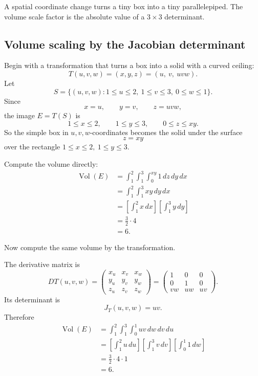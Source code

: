 A spatial coordinate change turns a tiny box into a tiny parallelepiped.  The volume
scale factor is the absolute value of a \(3\times3\) determinant.

\subsection{Volume scaling by the Jacobian determinant}

Begin with a transformation that turns a box into a solid with a curved ceiling:
\[
    T(u,v,w)=(x,y,z)=(u,\ v,\ uvw).
\]
Let
\[
    S=\{(u,v,w):1\le u\le2,\ 1\le v\le3,\ 0\le w\le1\}.
\]
Since
\[
    x=u,\qquad y=v,\qquad z=uvw,
\]
the image \(E=T(S)\) is
\[
    1\le x\le2,
    \qquad
    1\le y\le3,
    \qquad
    0\le z\le xy.
\]
So the simple box in \(u,v,w\)-coordinates becomes the solid under the surface
\[
    z=xy
\]
over the rectangle \(1\le x\le2,\ 1\le y\le3\).

Compute the volume directly:
\[
\begin{aligned}
    \operatorname{Vol}(E)
    &=
    \int_1^2\int_1^3\int_0^{xy}1\,dz\,dy\,dx\\
    &=
    \int_1^2\int_1^3 xy\,dy\,dx\\
    &=
    \left[\int_1^2 x\,dx\right]
    \left[\int_1^3 y\,dy\right]\\
    &=
    \frac32\cdot4\\
    &=
    6.
\end{aligned}
\]

Now compute the same volume by the transformation.

The derivative matrix is
\[
    DT(u,v,w)
    =
    \begin{pmatrix}
        x_u&x_v&x_w\\
        y_u&y_v&y_w\\
        z_u&z_v&z_w
    \end{pmatrix}
    =
    \begin{pmatrix}
        1&0&0\\
        0&1&0\\
        vw&uw&uv
    \end{pmatrix}.
\]
Its determinant is
\[
    J_T(u,v,w)=uv.
\]
Therefore
\[
\begin{aligned}
    \operatorname{Vol}(E)
    &=
    \int_1^2\int_1^3\int_0^1 uv\,dw\,dv\,du\\
    &=
    \left[\int_1^2 u\,du\right]
    \left[\int_1^3 v\,dv\right]
    \left[\int_0^1 1\,dw\right]\\
    &=
    \frac32\cdot4\cdot1\\
    &=
    6.
\end{aligned}
\]

